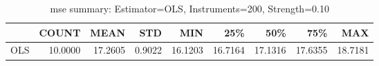 \begin{table}[ht]
\centering
\caption{mse summary: Estimator=OLS, Instruments=200, Strength=0.10}
\begin{tabular}{lrrrrrrrr}
\toprule
 & COUNT & MEAN & STD & MIN & 25\% & 50\% & 75\% & MAX \\
\midrule
OLS & 10.0000 & 17.2605 & 0.9022 & 16.1203 & 16.7164 & 17.1316 & 17.6355 & 18.7181 \\
\bottomrule
\end{tabular}
\end{table}
